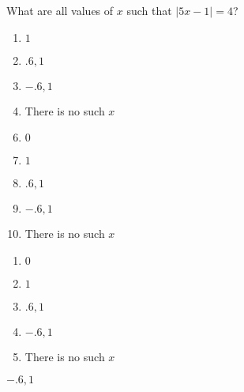 


  What are all values of $x$ such that $|5x-1|=4$?


\ifsat
	\begin{enumerate}[label=\Alph*)]
		\item  $1$
		\item $.6,1$
		\item $-.6,1$%
		\item There is no such $x$
	\end{enumerate}
\else
\fi

\ifacteven
	\begin{enumerate}[label=\textbf{\Alph*.},itemsep=\fill,align=left]
		\setcounter{enumii}{5}
		\item   $0$
		\item  $1$
		\item $.6,1$
		\addtocounter{enumii}{1}
		\item $-.6,1$%
		\item There is no such $x$
	\end{enumerate}
\else
\fi

\ifactodd
	\begin{enumerate}[label=\textbf{\Alph*.},itemsep=\fill,align=left]
		\item   $0$
		\item  $1$
		\item $.6,1$
		\item $-.6,1$%
		\item There is no such $x$
	\end{enumerate}
\else
\fi

\ifgridin
 $-.6,1$%
		
\else
\fi

